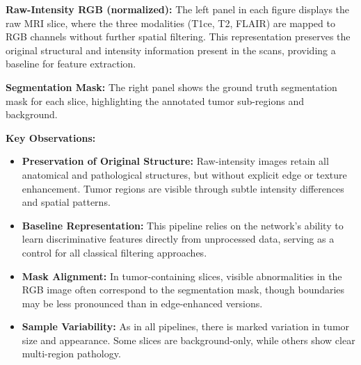 \textbf{Raw-Intensity RGB (normalized):}  
The left panel in each figure displays the raw MRI slice, where the three modalities (T1ce, T2, FLAIR) are mapped to RGB channels without further spatial filtering. This representation preserves the original structural and intensity information present in the scans, providing a baseline for feature extraction.

\textbf{Segmentation Mask:}  
The right panel shows the ground truth segmentation mask for each slice, highlighting the annotated tumor sub-regions and background.


\textbf{Key Observations:}
\begin{itemize}
    \item \textbf{Preservation of Original Structure:} Raw-intensity images retain all anatomical and pathological structures, but without explicit edge or texture enhancement. Tumor regions are visible through subtle intensity differences and spatial patterns.
    \item \textbf{Baseline Representation:} This pipeline relies on the network's ability to learn discriminative features directly from unprocessed data, serving as a control for all classical filtering approaches.
    \item \textbf{Mask Alignment:} In tumor-containing slices, visible abnormalities in the RGB image often correspond to the segmentation mask, though boundaries may be less pronounced than in edge-enhanced versions.
    \item \textbf{Sample Variability:} As in all pipelines, there is marked variation in tumor size and appearance. Some slices are background-only, while others show clear multi-region pathology.
\end{itemize}

